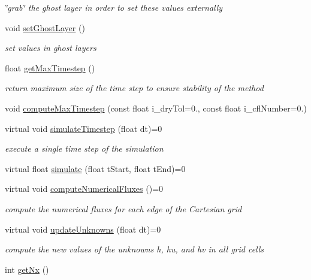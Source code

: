 \begin{DoxyCompactItemize}
\begin{DoxyCompactList}\small\item\em \char`\"{}grab\char`\"{} the ghost layer in order to set these values externally \end{DoxyCompactList}\item 
void \hyperlink{classSWE__Block_afd17334abee3145e27cc3c9b7b935da2}{set\-Ghost\-Layer} ()
\begin{DoxyCompactList}\small\item\em set values in ghost layers \end{DoxyCompactList}\item 
float \hyperlink{classSWE__Block_a74da1eb712e639e47b5b848081b2afad}{get\-Max\-Timestep} ()
\begin{DoxyCompactList}\small\item\em return maximum size of the time step to ensure stability of the method \end{DoxyCompactList}\item 
void \hyperlink{classSWE__Block_acf2ff6617cbc0d3d837f0e618039cfe2}{compute\-Max\-Timestep} (const float i\-\_\-dry\-Tol=0., const float i\-\_\-cfl\-Number=0.)
\item 
\hypertarget{classSWE__Block_a4fb41f3bbbda88992e5bce802e139c9b}{virtual void \hyperlink{classSWE__Block_a4fb41f3bbbda88992e5bce802e139c9b}{simulate\-Timestep} (float dt)=0}\label{classSWE__Block_a4fb41f3bbbda88992e5bce802e139c9b}

\begin{DoxyCompactList}\small\item\em execute a single time step of the simulation \end{DoxyCompactList}\item 
virtual float \hyperlink{classSWE__Block_a1da88bb47008dc9246a8c47d00575d1e}{simulate} (float t\-Start, float t\-End)=0
\item 
virtual void \hyperlink{classSWE__Block_a94dcf2c6ae31731e4586e45628b0c00e}{compute\-Numerical\-Fluxes} ()=0
\begin{DoxyCompactList}\small\item\em compute the numerical fluxes for each edge of the Cartesian grid \end{DoxyCompactList}\item 
virtual void \hyperlink{classSWE__Block_ab2b4b659f23d5d45413dece8d2da3298}{update\-Unknowns} (float dt)=0
\begin{DoxyCompactList}\small\item\em compute the new values of the unknowns h, hu, and hv in all grid cells \end{DoxyCompactList}\item 
\hypertarget{classSWE__Block_aa27028fa4bc13bb2d9251b09e0fdfce6}{int \hyperlink{classSWE__Block_aa27028fa4bc13bb2d9251b09e0fdfce6}{get\-Nx} ()}\label{classSWE__Block_aa27028fa4bc13bb2d9251b09e0fdfce6}


\end{DoxyCompactItemize}
